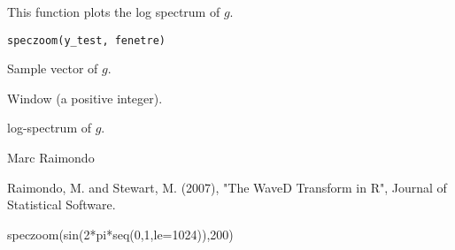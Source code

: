 \documentclass{article}
\begin{document}
\begin{Description}\relax
This function plots  the log spectrum of $g$.
\end{Description}
\begin{Usage}
\begin{verbatim}
speczoom(y_test, fenetre)
\end{verbatim}
\end{Usage}
\begin{Arguments}
\begin{ldescription}
\item[\code{y\_test}] Sample vector of $g$.  
\item[\code{fenetre}] Window (a positive integer). 
\end{ldescription}
\end{Arguments}
\begin{Value}
log-spectrum of $g$.
\end{Value}
\begin{Author}\relax
Marc Raimondo
\end{Author}
\begin{References}\relax
Raimondo, M. and Stewart, M. (2007),
"The WaveD Transform in R", Journal of Statistical Software.
\end{References}
\begin{SeeAlso}\relax
{}
\end{SeeAlso}
\begin{Examples}
\begin{ExampleCode}speczoom(sin(2*pi*seq(0,1,le=1024)),200) \end{ExampleCode}
\end{Examples}
\end{document}
